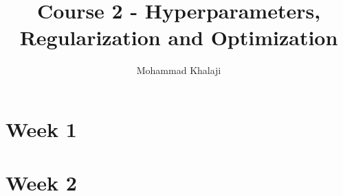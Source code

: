 \documentclass[10pt,a4paper]{article}
\author{Mohammad Khalaji}
\title{Course 2 - Hyperparameters, Regularization and Optimization}
\begin{document}
\maketitle
\section{Week 1}

\newpage
\section{Week 2}

% 
\end{document}
